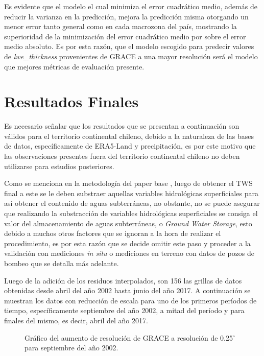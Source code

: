 Es evidente que el modelo el cual minimiza el error cuadrático medio, además de reducir la varianza en la predicción, mejora la predicción misma otorgando un menor error tanto
general como en cada macrozona del país, mostrando la superioridad de la minimización del error cuadrático medio por sobre el error medio absoluto. Es por esta razón, que el modelo escogido para 
predecir valores de \textit{lwe\_thickness} provenientes de GRACE a una mayor resolución será el modelo que mejores métricas de evaluación presente.
%
%
%
%
\section{Resultados Finales}
Es necesario señalar que los resultados que se presentan a continuación son válidos para el territorio continental chileno, debido a la naturaleza de las bases de datos, específicamente de ERA5-Land y precipitación, es 
por este motivo que las observaciones presentes fuera del territorio continental chileno no deben utilizarse para estudios posteriores.

Como se menciona en la metodología del paper base \cite{11}, luego de obtener el TWS final a este se le deben substraer aquellas variables hidrológicas superficiales para así
obtener el contenido de aguas subterráneas, no obstante, no se puede asegurar que realizando la substracción de variables hidrológicas superficiales se consiga el valor del almacenamiento de aguas subterráneas, o 
\textit{Ground Water Storage}, esto debido a muchos otros factores que se ignoran a la hora de realizar el procedimiento, es por esta razón que se decide omitir este paso y proceder a la validación con mediciones \textit{in situ} o mediciones en terreno con datos de pozos de bombeo que 
se detalla más adelante.

Luego de la adición de los residuos interpolados, son 156 las grillas de datos obtenidas desde abril del año 2002 hasta junio del año 2017. A continuación se muestran los datos con reducción de escala para
uno de los primeros períodos de tiempo, específicamente septiembre del año 2002, a mitad del período y para finales del mismo, es decir, abril del año 2017.

\begin{figure}[H]
    \centering
          \goodgap
          \vskip -0.1in
    \caption[\textit{Downscalling} final para el mes 09/2002]{Gráfico del aumento de resolución de GRACE a resolución de 0.25$^{\circ}$ para septiembre del año 2002.}
    \label{dsf02}
\end{figure}


